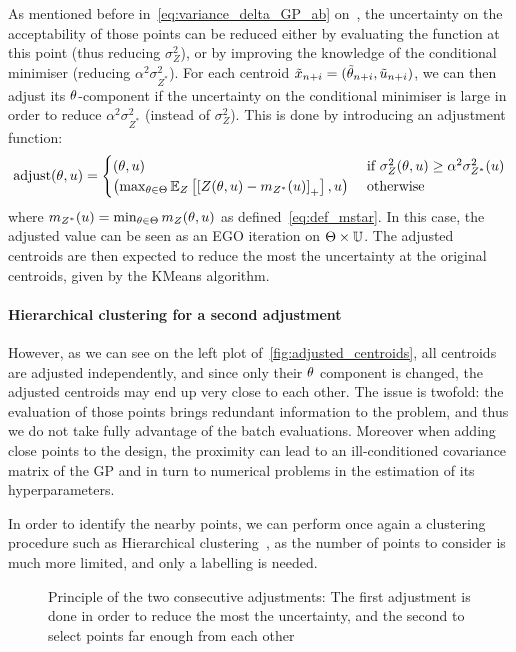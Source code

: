\documentclass[../../Main_ManuscritThese.tex]{subfiles}
\newcommand\imgpath{/home/victor/acadwriting/Manuscrit/Text/Chapter4/img/}
\begin{document}
As mentioned before in~\cref{eq:variance_delta_GP_ab}
on~, the uncertainty on the
acceptability of those points can be reduced either by evaluating the
function at this point (thus reducing $\sigma^2_Z$), or by improving the
knowledge of the conditional minimiser (reducing
$\alpha^2 \sigma^2_{Z^*}$). For each centroid
$\tilde{x}_{n+i} = (\tilde{\theta}_{n+i}, \tilde{u}_{n+i})$, we can
then adjust its $\theta$-component if the uncertainty on the conditional
minimiser is large in order to reduce $\alpha^2 \sigma_{Z^*}^2$
(instead of $\sigma^2_Z$). This is done by introducing an adjustment
function:
\begin{equation}
  \label{eq:adjust_centroid}
  \mathrm{adjust}(\theta,u) =
  \begin{cases}
    (\theta, u) & \text{ if }\sigma^2_Z(\theta, u) \geq \alpha^2\sigma^2_{Z^*}(u)\\
    \left(\max_{\theta\in\Theta} \mathbb{E}_Z\left[\left[Z(\theta,u) - m_{{Z^*}}(u)\right]_+ \right], u \right) & \text{ otherwise}
  \end{cases}
\end{equation}
where $m_{{Z^*}}(u) = \min_{\theta\in\Theta} m_Z(\theta, u)$ as
defined~\eqref{eq:def_mstar}. In this case, the adjusted value can be
seen as an EGO iteration on $\Theta \times \mathbb{U}$. The adjusted
centroids are then expected to reduce the most the uncertainty at the
original centroids, given by the KMeans algorithm.

\paragraph{Hierarchical clustering for a second adjustment}
However, as we can see on the left plot
of~\cref{fig:adjusted_centroids}, all centroids are adjusted
independently, and since only their $\theta$ component is changed, the
adjusted centroids may end up very close to each other. The issue is
twofold: the evaluation of those points brings redundant information
to the problem, and thus we do not take fully advantage of the batch
evaluations. Moreover when adding close points to the design, the
proximity can lead to an ill-conditioned covariance matrix of the GP
and in turn to numerical problems in the estimation of its
hyperparameters.


In order to identify the nearby points, we can perform once
again %
a clustering procedure such as Hierarchical
clustering~\citep{nielsen_hierarchical_2016}, as the number of points
to consider is much more limited, and only a labelling is needed. 
\begin{figure}[ht]
  \centering
  \resizebox{0.9\textwidth}{!}{}
  \caption[Principle of the two consecutive adjustments for batch
  selection]{\label{fig:schema_double_adj} Principle of the two
    consecutive adjustments: The first adjustment is done in order to
    reduce the most the uncertainty, and the second to select points
     far enough from each other}
\end{figure}
\end{document}
